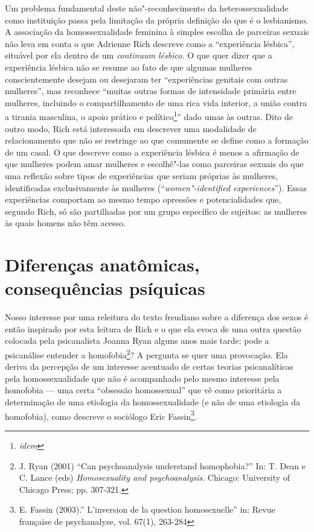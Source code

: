 Um problema fundamental deste não"-reconhecimento da heterossexualidade
como instituição passa pela limitação da própria definição do que é o
lesbianismo. A associação da homossexualidade feminina à simples escolha
de parceiras sexuais não leva em conta o que Adrienne Rich descreve como
a ``experiência lésbica'', situável por ela dentro de um \emph{continuum
lésbico.} O que quer dizer que a experiência lésbica não se resume ao
fato de que algumas mulheres conscientemente desejam ou desejaram ter
``experiências genitais com outras mulheres'', mas reconhece ``muitas
outras formas de intensidade primária entre mulheres, incluindo o
compartilhamento de uma rica vida interior, a união contra a tirania
masculina, o apoio prático e político\footnote{\emph{idem}}'' dado umas
às outras. Dito de outro modo, Rich está interessada em descrever uma
modalidade de relacionamento que não se restringe ao que comumente se
define como a formação de um casal. O que descreve como a experiência
lésbica é menos a afirmação de que mulheres podem amar mulheres e
escolhê"-las como parceiras sexuais do que uma reflexão sobre tipos de
experiências que seriam próprias às mulheres, identificadas
exclusivamente às mulheres (``\emph{women"-identified experiences}'').
Essas experiências comportam ao mesmo tempo opressões e potencialidades
que, segundo Rich, só são partilhadas por um grupo específico de
sujeitos: as mulheres às quais homens não têm acesso.

\section{Diferenças anatômicas, consequências psíquicas}

Nosso interesse por uma releitura do texto freudiano sobre a diferença
dos sexos é então inspirado por esta leitura de Rich e o que ela evoca
de uma outra questão colocada pela psicanalista Joanna Ryan alguns anos
mais tarde: pode a psicanálise entender a homofobia\footnote{J. Ryan
  (2001) ``Can psychoanalysis understand homophobia?'' In: T. Dean e C.
  Lance (eds) \emph{Homosexuality and psychoanalysis}. Chicago:
  University of Chicago Press; pp. 307-321.}? A pergunta se quer uma
provocação. Ela deriva da percepção de um interesse acentuado de certas
teorias psicanalíticas pela homossexualidade que não é acompanhado pelo
mesmo interesse pela homofobia --- uma certa ``obsessão homossexual'' que
vê como prioritária a determinação de uma etiologia da homossexualidade
(e não de uma etiologia da homofobia), como descreve o sociólogo Eric
Fassin\footnote{E. Fassin (2003).'' L'inversion de la question
  homosexuelle'' in: Revue française de psychanalyse, vol. 67(1),
  263-284}.

